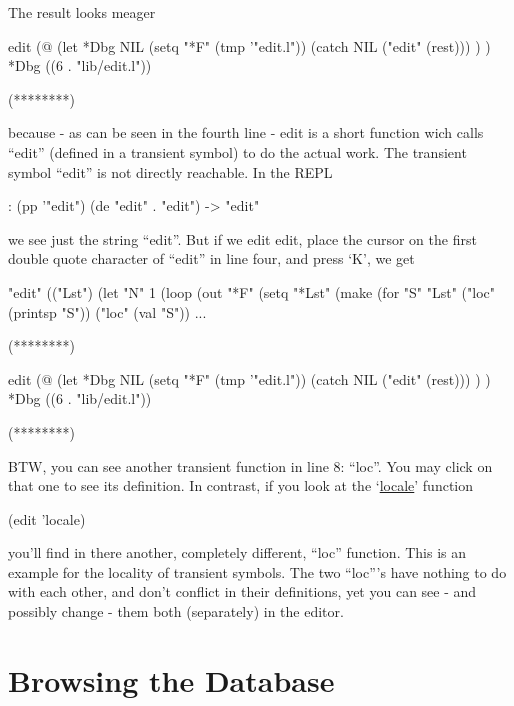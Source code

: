 The result looks meager


\begin{wideverbatim}
edit (@
   (let *Dbg NIL
      (setq "*F" (tmp '"edit.l"))
      (catch NIL ("edit" (rest))) ) )
   *Dbg ((6 . "lib/edit.l"))

(********)
\end{wideverbatim}

because - as can be seen in the fourth line - edit is a short function
wich calls ``edit'' (defined in a transient symbol) to do the actual work.
 The transient symbol ``edit'' is not directly reachable. In the REPL


\begin{wideverbatim}
: (pp '"edit")
(de "edit" . "edit")
-> "edit"
\end{wideverbatim}

we see just the string ``edit''.
 But if we edit edit, place the cursor on the first double quote
character of ``edit'' in line four, and press `K', we get


\begin{wideverbatim}
"edit" (("Lst")
   (let "N" 1
      (loop
         (out "*F"
            (setq
               "*Lst" (make
                  (for "S" "Lst"
                     ("loc" (printsp "S"))
                     ("loc" (val "S"))
...

(********)

edit (@
   (let *Dbg NIL
      (setq "*F" (tmp '"edit.l"))
      (catch NIL ("edit" (rest))) ) )
   *Dbg ((6 . "lib/edit.l"))

(********)
\end{wideverbatim}

BTW, you can see another transient function in line 8: ``loc''. You may
click on that one to see its definition.
 In contrast, if you look at the
`\href{http://software-lab.de/doc/refL.html#locale}{locale}' function


\begin{wideverbatim}
(edit 'locale)
\end{wideverbatim}

you'll find in there another, completely different, ``loc'' function. This
is an example for the locality of transient symbols. The two ``loc'''s
have nothing to do with each other, and don't conflict in their
definitions, yet you can see - and possibly change - them both
(separately) in the editor.


\section{Browsing the Database}
\label{sec:edit-browsing-the-database}


